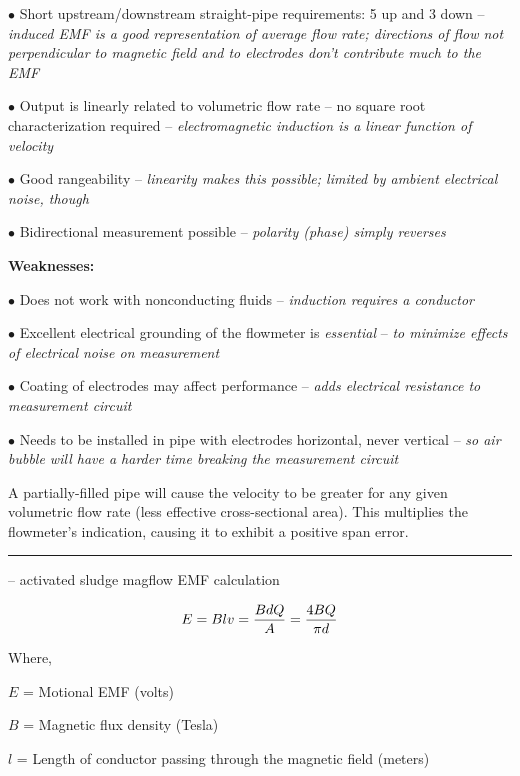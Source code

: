 \medskip
\item{$\bullet$} Short upstream/downstream straight-pipe requirements: 5 up and 3 down -- {\it induced EMF is a good representation of average flow rate; directions of flow not perpendicular to magnetic field and to electrodes don't contribute much to the EMF}
\item{$\bullet$} Output is linearly related to volumetric flow rate -- no square root characterization required -- {\it electromagnetic induction is a linear function of velocity}
\item{$\bullet$} Good rangeability -- {\it linearity makes this possible; limited by ambient electrical noise, though}
\item{$\bullet$} Bidirectional measurement possible -- {\it polarity (phase) simply reverses}
\medskip

\vskip 10pt

{\bf Weaknesses:}

\medskip
\item{$\bullet$} Does not work with nonconducting fluids -- {\it induction requires a conductor}
\item{$\bullet$} Excellent electrical grounding of the flowmeter is {\it essential} -- {\it to minimize effects of electrical noise on measurement}
\item{$\bullet$} Coating of electrodes may affect performance -- {\it adds electrical resistance to measurement circuit}
\item{$\bullet$} Needs to be installed in pipe with electrodes horizontal, never vertical -- {\it so air bubble will have a harder time breaking the measurement circuit}
\medskip

\vskip 10pt

A partially-filled pipe will cause the velocity to be greater for any given volumetric flow rate (less effective cross-sectional area).  This multiplies the flowmeter's indication, causing it to exhibit a positive span error.

\filbreak \vskip 5pt \hrule \vskip 5pt  -- activated sludge magflow EMF calculation \vskip 10pt

$$E = Blv = {B d Q \over A} = {4 B Q \over \pi d}$$

\noindent
Where,

$E$ = Motional EMF (volts)

$B$ = Magnetic flux density (Tesla)

$l$ = Length of conductor passing through the magnetic field (meters)

